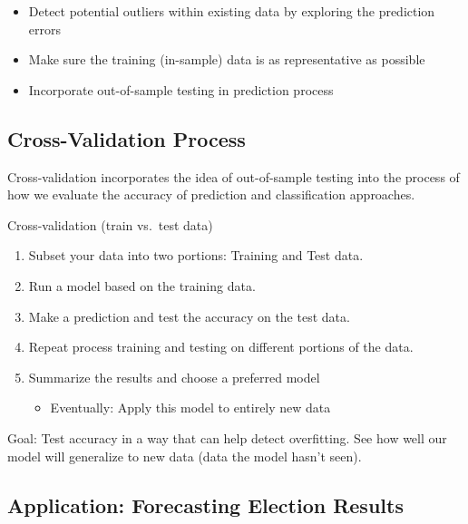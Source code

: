 \documentclass[
  letterpaper,
  DIV=11,
  numbers=noendperiod]{scrreprt}
\providecommand{\tightlist}{%
  \setlength{\itemsep}{0pt}\setlength{\parskip}{0pt}}\usepackage{longtable,booktabs,array}
\begin{document}
\begin{itemize}
\tightlist
\item
  Detect potential outliers within existing data by exploring the
  prediction errors
\item
  Make sure the training (in-sample) data is as representative as
  possible
\item
  Incorporate out-of-sample testing in prediction process
\end{itemize}

\hypertarget{cross-validation-process}{%
\subsection{Cross-Validation Process}\label{cross-validation-process}}

Cross-validation incorporates the idea of out-of-sample testing into the
process of how we evaluate the accuracy of prediction and classification
approaches.

Cross-validation (train vs.~test data)

\begin{enumerate}
\def\labelenumi{\arabic{enumi}.}
\tightlist
\item
  Subset your data into two portions: Training and Test data.
\item
  Run a model based on the training data.
\item
  Make a prediction and test the accuracy on the test data.
\item
  Repeat process training and testing on different portions of the data.
\item
  Summarize the results and choose a preferred model

  \begin{itemize}
  \tightlist
  \item
    Eventually: Apply this model to entirely new data
  \end{itemize}
\end{enumerate}

Goal: Test accuracy in a way that can help detect overfitting. See how
well our model will generalize to new data (data the model hasn't seen).

\hypertarget{application-forecasting-election-results}{%
\subsection{Application: Forecasting Election
Results}\label{application-forecasting-election-results}}
\end{document}

